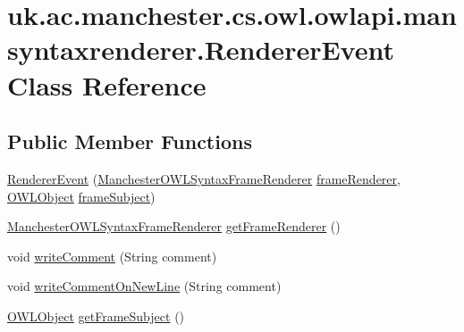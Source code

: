 \hypertarget{classuk_1_1ac_1_1manchester_1_1cs_1_1owl_1_1owlapi_1_1mansyntaxrenderer_1_1_renderer_event}{\section{uk.\-ac.\-manchester.\-cs.\-owl.\-owlapi.\-mansyntaxrenderer.\-Renderer\-Event Class Reference}
\label{classuk_1_1ac_1_1manchester_1_1cs_1_1owl_1_1owlapi_1_1mansyntaxrenderer_1_1_renderer_event}
}
\subsection*{Public Member Functions}
\begin{DoxyCompactItemize}
\item 
\hyperlink{classuk_1_1ac_1_1manchester_1_1cs_1_1owl_1_1owlapi_1_1mansyntaxrenderer_1_1_renderer_event_a4101ed12226ec44124bdf4665cfaa7ec}{Renderer\-Event} (\hyperlink{classuk_1_1ac_1_1manchester_1_1cs_1_1owl_1_1owlapi_1_1mansyntaxrenderer_1_1_manchester_o_w_l_syntax_frame_renderer}{Manchester\-O\-W\-L\-Syntax\-Frame\-Renderer} \hyperlink{classuk_1_1ac_1_1manchester_1_1cs_1_1owl_1_1owlapi_1_1mansyntaxrenderer_1_1_renderer_event_afd2d46fb3ec6624d09e506b29f4af64b}{frame\-Renderer}, \hyperlink{interfaceorg_1_1semanticweb_1_1owlapi_1_1model_1_1_o_w_l_object}{O\-W\-L\-Object} \hyperlink{classuk_1_1ac_1_1manchester_1_1cs_1_1owl_1_1owlapi_1_1mansyntaxrenderer_1_1_renderer_event_a846a72e714f893b5e4d8b0d98f315fbc}{frame\-Subject})
\item 
\hyperlink{classuk_1_1ac_1_1manchester_1_1cs_1_1owl_1_1owlapi_1_1mansyntaxrenderer_1_1_manchester_o_w_l_syntax_frame_renderer}{Manchester\-O\-W\-L\-Syntax\-Frame\-Renderer} \hyperlink{classuk_1_1ac_1_1manchester_1_1cs_1_1owl_1_1owlapi_1_1mansyntaxrenderer_1_1_renderer_event_a8297b08ebc39e97ef9188f3afa1bad25}{get\-Frame\-Renderer} ()
\item 
void \hyperlink{classuk_1_1ac_1_1manchester_1_1cs_1_1owl_1_1owlapi_1_1mansyntaxrenderer_1_1_renderer_event_a31e60310aca5ebb02047f5627ac52d52}{write\-Comment} (String comment)
\item 
void \hyperlink{classuk_1_1ac_1_1manchester_1_1cs_1_1owl_1_1owlapi_1_1mansyntaxrenderer_1_1_renderer_event_aede6c6deb17e114f3eb6d64f9963031f}{write\-Comment\-On\-New\-Line} (String comment)
\item 
\hyperlink{interfaceorg_1_1semanticweb_1_1owlapi_1_1model_1_1_o_w_l_object}{O\-W\-L\-Object} \hyperlink{classuk_1_1ac_1_1manchester_1_1cs_1_1owl_1_1owlapi_1_1mansyntaxrenderer_1_1_renderer_event_a121d3dafc8778abbcf460ada32eba854}{get\-Frame\-Subject} ()
\end{DoxyCompactItemize}

